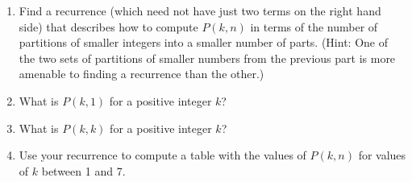 {\begin{enumerate}
{Removing one from each part of a partition of $k$ into $n$
parts gives us a bijection between partitions of $k$ into $n$ parts
and and partitions $k-n$ into $n$ or fewer parts.  (Removing one from
each part of a partition of $k$ into $n$ parts  gives us such a
partition, and, given such a partition, we get a partition of $k$ into
$n$ parts by adding one to each part and then creating enough parts of
size 1 to have $n$ parts.)}
\item Find a recurrence (which need not have just two terms on the
right hand side) that describes how to compute $P(k,n)$ in terms of the
number of partitions of smaller integers into a smaller number of
parts. (Hint: One of the two sets of partitions of smaller numbers
from the previous part is more amenable to finding a recurrence than the
other.)

\item What is $P(k,1)$ for a positive integer $k$?

\item What is $P(k,k)$ for a positive integer $k$?

\item Use your recurrence to compute a table with the values of
$P(k,n)$ for values of $k$ between 1 and 7.


\end{enumerate}}
